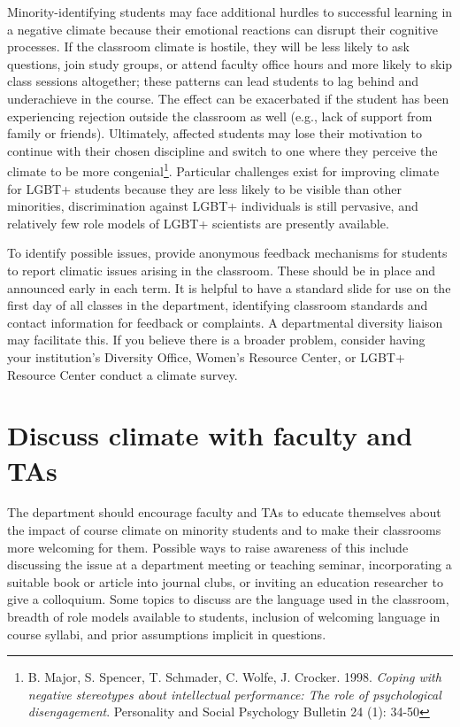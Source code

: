 Minority-identifying students may face additional hurdles to successful learning in a negative climate because their emotional reactions can disrupt their cognitive processes. If the classroom climate is hostile, they will be less likely to ask questions, join study groups, or attend faculty office hours and more likely to skip class sessions altogether; these patterns can lead students to lag behind and underachieve in the course. The effect can be exacerbated if the student has been experiencing rejection outside the classroom as well (e.g., lack of support from family or friends). Ultimately, affected students may lose their motivation to continue with their chosen discipline and switch to one where they perceive the climate to be more congenial\footnote{B. Major, S. Spencer, T. Schmader, C. Wolfe, J. Crocker. 1998. \emph{Coping with negative stereotypes about intellectual performance: The role of psychological disengagement}. Personality and Social Psychology Bulletin 24 (1): 34-50}. Particular challenges exist for improving climate for LGBT+ students because they are less likely to be visible than other minorities, discrimination against LGBT+ individuals is still pervasive, and relatively few role models of LGBT+ scientists are presently available.

To identify possible issues, provide anonymous feedback mechanisms for students to report climatic issues arising in the classroom. These should be in place and announced early in each term. It is helpful to have a standard slide for use on the first day of all classes in the department, identifying classroom standards and contact information for feedback or complaints. A departmental diversity liaison may facilitate this. If you believe there is a broader problem, consider having your institution's Diversity Office, Women's Resource Center, or LGBT+ Resource Center conduct a climate survey.

\section {Discuss climate with faculty and TAs}
\label{train-faculty}
The department should encourage faculty and TAs to educate themselves about the impact of course climate on minority students and to make their classrooms more welcoming for them. Possible ways to raise awareness of this include discussing the issue at a department meeting or teaching seminar, incorporating a suitable book or article into journal clubs, or inviting an education researcher to give a colloquium. Some topics to discuss are the language used in the classroom, breadth of role models available to students, inclusion of welcoming language in course syllabi, and prior assumptions implicit in questions.

